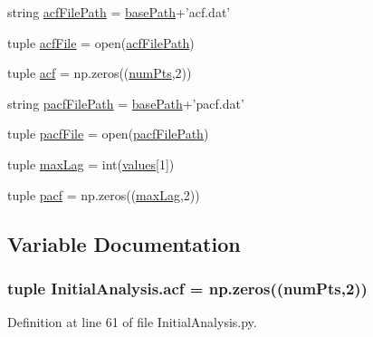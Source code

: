 \begin{DoxyCompactItemize}
\item 
string \hyperlink{namespace_initial_analysis_a4ddd93459df9f2f6eafa747227f54916}{acf\-File\-Path} = \hyperlink{namespace_initial_analysis_a462d97ae58744d7f39a0a11f5a4f7642}{base\-Path}+'acf.\-dat'
\item 
tuple \hyperlink{namespace_initial_analysis_a90ac90deb3293de6009ff8774a0fa67e}{acf\-File} = open(\hyperlink{namespace_initial_analysis_a4ddd93459df9f2f6eafa747227f54916}{acf\-File\-Path})
\item 
tuple \hyperlink{namespace_initial_analysis_ad2fd8d91ea772dbb0bbe665e7dbf81d4}{acf} = np.\-zeros((\hyperlink{namespace_initial_analysis_af97ec4666037a95d5ae94bf162868749}{num\-Pts},2))
\item 
string \hyperlink{namespace_initial_analysis_ac8cf076709e57b76c8ac1d19775b1aa3}{pacf\-File\-Path} = \hyperlink{namespace_initial_analysis_a462d97ae58744d7f39a0a11f5a4f7642}{base\-Path}+'pacf.\-dat'
\item 
tuple \hyperlink{namespace_initial_analysis_a0b2e4511acd1a69080718a129a84637a}{pacf\-File} = open(\hyperlink{namespace_initial_analysis_ac8cf076709e57b76c8ac1d19775b1aa3}{pacf\-File\-Path})
\item 
tuple \hyperlink{namespace_initial_analysis_a4c72105d2ca5ecffdfd26e4eddedcccc}{max\-Lag} = int(\hyperlink{namespace_initial_analysis_a0b1c5b1315c0dd0f36fedc78bf764504}{values}\mbox{[}1\mbox{]})
\item 
tuple \hyperlink{namespace_initial_analysis_a23fa87d68ed30a85f09941a0e5fb2fb1}{pacf} = np.\-zeros((\hyperlink{namespace_initial_analysis_a4c72105d2ca5ecffdfd26e4eddedcccc}{max\-Lag},2))
\end{DoxyCompactItemize}


\subsection{Variable Documentation}
\hypertarget{namespace_initial_analysis_ad2fd8d91ea772dbb0bbe665e7dbf81d4}{
\subsubsection[{acf}]{\setlength{\rightskip}{0pt plus 5cm}tuple Initial\-Analysis.\-acf = np.\-zeros(({\bf num\-Pts},2))}}\label{namespace_initial_analysis_ad2fd8d91ea772dbb0bbe665e7dbf81d4}


Definition at line 61 of file Initial\-Analysis.\-py.

